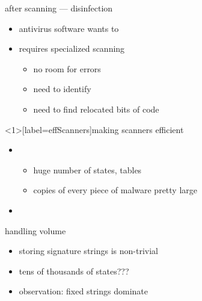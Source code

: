 \begin{frame}{after scanning --- disinfection}
    \begin{itemize}
    \item antivirus software wants to 
    \item requires specialized scanning
        \begin{itemize}
        \item no room for errors
        \item need to identify 
        \item need to find relocated bits of code
        \end{itemize}
    \end{itemize}
\end{frame}

\begin{frame}<1>[label=effScanners]{making scanners efficient}
    \begin{itemize}
    \item {}
        \begin{itemize}
        \item huge number of states, tables
        \item copies of every piece of malware pretty large
        \end{itemize}
    \item {}
    \end{itemize}
\end{frame}


\begin{frame}{handling volume}
    \begin{itemize}
    \item storing signature strings is non-trivial
    \item tens of thousands of states???
    \vspace{.5cm}
    \item observation: fixed strings dominate
    \end{itemize}
\end{frame}

